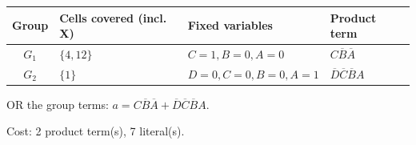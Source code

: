 \documentclass[a4paper,11pt]{article}
\begin{document}
\begin{minipage}{\textwidth}
\begin{center}\small
\begin{tabular}{clll}
\toprule
Group & Cells covered (incl. X) & Fixed variables & Product term\\\midrule
\textcolor{blue!75!black}{$G_{1}$} & $\{4,12\}$ & $C=1,B=0,A=0$ & $C\overline{B}\overline{A}$\\
\textcolor{red!75!black}{$G_{2}$} & $\{1\}$ & $D=0,C=0,B=0,A=1$ & $\overline{D}\overline{C}\overline{B}A$\\
\bottomrule\end{tabular}\end{center}


\noindent OR the group terms: $\boxed{a=C\overline{B}\overline{A} + \overline{D}\overline{C}\overline{B}A}$.

\noindent Cost: 2 product term(s), 7 literal(s).

\end{minipage}\par\vspace{0.25cm}
\end{document}
